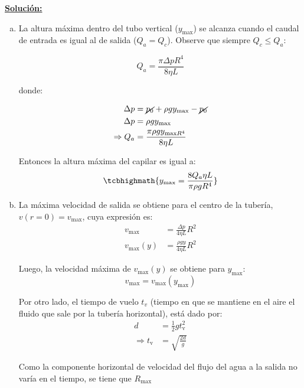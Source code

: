 \underline{\textbf{Solución:}}

\begin{enumerate}[a)]
	
	\item  La altura máxima dentro del tubo vertical (\(y_{\text{max}}\)) se alcanza cuando el caudal de entrada es igual al de salida (\( Q_a = Q_c \)). Observe que siempre \( Q_c \leq Q_a \):
	
	\begin{equation*}
		Q_a = \frac{\pi \Delta p R^4}{8 \eta L}
	\end{equation*}
	
	donde: 
	
	\begin{align*}
		\Delta p &= \cancel{p_0} + \rho g y_{\text{max}} - \cancel{p_0} \\
		\Delta p &= \rho g y_{\text{max}}\\
		\Rightarrow Q_a &= \frac{\pi \rho g y_{\text{max} R^4} }{8 \eta L}
	\end{align*}
	
	Entonces la altura máxima del capilar es igual a:
	\begin{equation}
	\tcbhighmath{y_{\text{max}} = \dfrac{8 Q_a \eta L}{\pi \rho g R^4}}
	\end{equation}
	
	\item La máxima velocidad de salida se obtiene para el centro de la tubería, $v(r=0)=v_{\text{max}}$, cuya expresión es:
	\begin{align*}
	v_{\text{max}} &= \frac{\Delta p}{4 \eta L}R^2 \\
	v_{\text{max}} (y) &= \frac{\rho g y}{4 \eta L}R^2
	\end{align*}
	
	Luego, la velocidad máxima de \(v_{\text{max}}(y)\) se obtiene para \(y_{\text{max}}\):
	\begin{equation*}
	v_{\text{max}} = v_{\text{max}}\left(y_{\text{max}}\right)
	\end{equation*}
	
	Por otro lado, el tiempo de vuelo $t_v$ (tiempo en que se mantiene en el aire el fluido que sale por la tubería horizontal), está dado por:
	\begin{align*}
		d &= \frac{1}{2} g t_{\text{v}}^2 \\
		\Rightarrow t_{\text{v}} &= \sqrt{\frac{2d}{g}}
	\end{align*}
	
	Como la componente horizontal de velocidad del flujo del agua a la salida no varía en el tiempo, se tiene que \( R_{\text{max}} \)
	

\end{enumerate}
